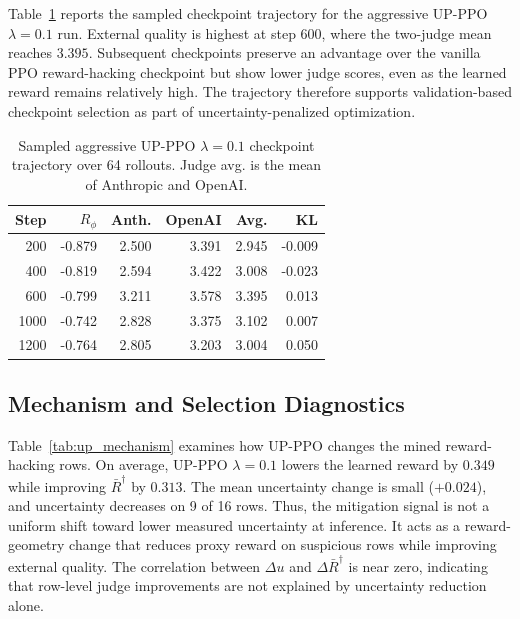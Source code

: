 \documentclass[twocolumn,10pt]{article}
\newcommand{\Rphi}{R_{\phi}}
\begin{document}
Table~\ref{tab:up_lambda01_trajectory} reports the sampled checkpoint trajectory for the aggressive UP-PPO $\lambda=0.1$ run. External quality is highest at step 600, where the two-judge mean reaches $3.395$. Subsequent checkpoints preserve an advantage over the vanilla PPO reward-hacking checkpoint but show lower judge scores, even as the learned reward remains relatively high. The trajectory therefore supports validation-based checkpoint selection as part of uncertainty-penalized optimization.

\begin{table}[!tbp]
\centering
\scriptsize
\caption{Sampled aggressive UP-PPO $\lambda=0.1$ checkpoint trajectory over 64 rollouts. Judge avg. is the mean of Anthropic and OpenAI.}
\label{tab:up_lambda01_trajectory}
\begin{tabular}{rrrrrr}
\toprule
Step & $\Rphi$ & Anth. & OpenAI & Avg. & KL \\
\midrule
200 & -0.879 & 2.500 & 3.391 & 2.945 & -0.009 \\
400 & -0.819 & 2.594 & 3.422 & 3.008 & -0.023 \\
600 & -0.799 & 3.211 & 3.578 & 3.395 & 0.013 \\
1000 & -0.742 & 2.828 & 3.375 & 3.102 & 0.007 \\
1200 & -0.764 & 2.805 & 3.203 & 3.004 & 0.050 \\
\bottomrule
\end{tabular}
\end{table}



\subsection{Mechanism and Selection Diagnostics}
Table~\ref{tab:up_mechanism} examines how UP-PPO changes the mined reward-hacking rows. On average, UP-PPO $\lambda=0.1$ lowers the learned reward by $0.349$ while improving $\bar R^\dagger$ by $0.313$. The mean uncertainty change is small ($+0.024$), and uncertainty decreases on 9 of 16 rows. Thus, the mitigation signal is not a uniform shift toward lower measured uncertainty at inference. It acts as a reward-geometry change that reduces proxy reward on suspicious rows while improving external quality. The correlation between $\Delta u$ and $\Delta\bar R^\dagger$ is near zero, indicating that row-level judge improvements are not explained by uncertainty reduction alone.
\end{document}
